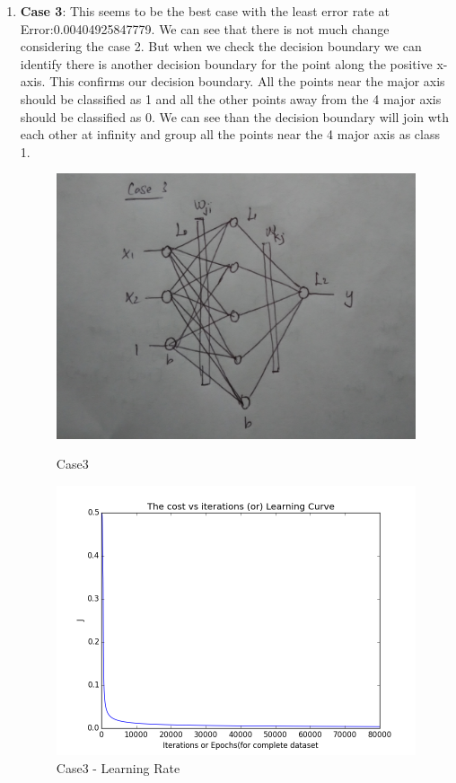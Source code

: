 \documentclass[10pt, letterpaper]{article}
\begin{document}
\begin{enumerate}
\item \textbf{Case 3}: This seems to be the best case with the least error rate at Error:0.00404925847779. We can see that there is not much change considering the case 2. But when we check the decision boundary we can identify there is another decision boundary for the point along the positive x-axis. This confirms our decision boundary. All the points near the major axis should be classified as 1 and all the other points away from the 4 major axis should be classified as 0. We can see than the decision boundary will join wth each other at infinity and group all the points near the 4 major axis as class 1.

\begin{figure}[h!]
\centering
\includegraphics[scale=0.1]{case3.jpg}
\caption{Case3}
\label{fig:Case3}

\centering
\includegraphics[scale=0.5]{3_5_1_learning.png}
\caption{Case3 - Learning Rate}
\label{fig:LR3}


\end{figure}
\end{enumerate}
\end{document}
